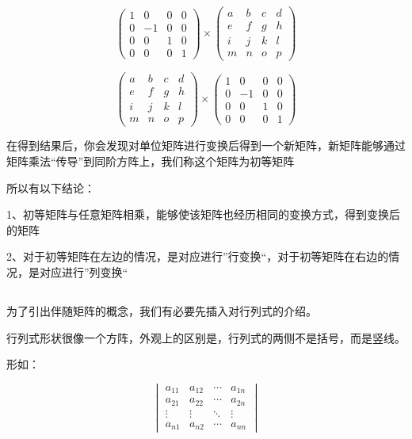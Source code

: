 \documentclass[12pt,a4paper]{book}
\begin{document}
\[
\begin{pmatrix}
1&0&0&0\\
0&-1&0&0\\
0&0&1&0\\
0&0&0&1
\end{pmatrix}
\times
\begin{pmatrix}
a&b&c&d\\
e&f&g&h\\
i&j&k&l\\
m&n&o&p
\end{pmatrix}
\]

\[
\begin{pmatrix}
a&b&c&d\\
e&f&g&h\\
i&j&k&l\\
m&n&o&p
\end{pmatrix}
\times
\begin{pmatrix}
1&0&0&0\\
0&-1&0&0\\
0&0&1&0\\
0&0&0&1
\end{pmatrix}
\]

在得到结果后，你会发现对单位矩阵进行变换后得到一个新矩阵，新矩阵能够通过矩阵乘法“传导”到同阶方阵上，我们称这个矩阵为初等矩阵

所以有以下结论：

\vspace{10pt}

1、初等矩阵与任意矩阵相乘，能够使该矩阵也经历相同的变换方式，得到变换后的矩阵

2、对于初等矩阵在左边的情况，是对应进行”行变换“，对于初等矩阵在右边的情况，是对应进行”列变换“

\vspace{10pt}

{\subsection{\centering\fontsize{20pt}{15pt}}}
为了引出伴随矩阵的概念，我们有必要先插入对行列式的介绍。

行列式形状很像一个方阵，外观上的区别是，行列式的两侧不是括号，而是竖线。

\vspace{10pt}
形如：

\[
\begin{vmatrix}
a_{11} & a_{12} & \cdots & a_{1n}\\
a_{21} & a_{22} & \cdots & a_{2n}\\
\vdots & \vdots & \ddots & \vdots\\
a_{n1} & a_{n2} & \cdots & a_{nn}
\end{vmatrix}
\]
\end{document}
